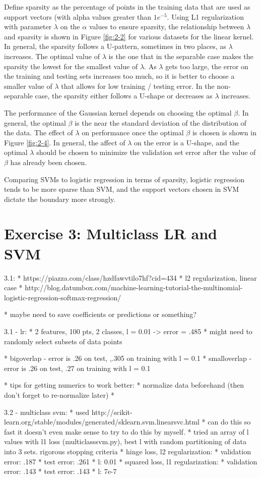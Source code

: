 \documentclass[10pt]{article}
\begin{document}
Define sparsity as the percentage of points in the training data that are used as support vectors (with alpha values greater than $1e^{-5}$. Using L1 regularization with parameter $\lambda$ on the $\alpha$ values to ensure sparsity, the relationship between $\lambda$ and sparsity is shown in Figure \ref{fig:2-2} for various datasets for the linear kernel. In general, the sparsity follows a U-pattern, sometimes in two places, as $\lambda$ increases. The optimal value of $\lambda$ is the one that in the separable case makes the sparsity the lowest for the smallest value of $\lambda$. As $\lambda$ gets too large, the error on the training and testing sets increases too much, so it is better to choose a smaller value of $\lambda$ that allows for low training / testing error. In the non-separable case, the sparsity either follows a U-shape or decreases as $\lambda$ increases.

The performance of the Gaussian kernel depends on choosing the optimal $\beta$. In general, the optimal $\beta$ is the near the standard deviation of the distribution of the data. The effect of $\lambda$ on performance once the optimal $\beta$ is chosen is shown in Figure \ref{fig:2-4}. In general, the affect of $\lambda$ on the error is a U-shape, and the optimal $\lambda$ should be chosen to minimize the validation set error after the value of $\beta$ has already been chosen.

Comparing SVMs to logistic regression in terms of sparsity, logistic regression tends to be more sparse than SVM, and the support vectors chosen in SVM dictate the boundary more strongly.

\section{Exercise 3: Multiclass LR and SVM}



3.1:
* https://piazza.com/class/hzdfawvtilo7hf?cid=434
* l2 regularization, linear case
* http://blog.datumbox.com/machine-learning-tutorial-the-multinomial-logistic-regression-softmax-regression/

* maybe need to save coefficients or predictions or something?

3.1 - lr:
* 2 features, 100 pts, 2 classes, l = 0.01 -> error = .485
* might need to randomly select subsets of data points

* bigoverlap - error is .26 on test, ,.305 on training with l = 0.1
* smalloverlap - error is .26 on test, .27 on training with l = 0.1

* tips for getting numerics to work better:
	* normalize data beforehand (then don't forget to re-normalize later)
	* 

3.2 - multiclass svm:
* used http://scikit-learn.org/stable/modules/generated/sklearn.svm.linearsvc.html
* can do this so fast it doesn't even make sense to try to do this by myself.
* tried an array of l values with l1 loss (multiclasssvm.py), best l with random partitioning of data into 3 sets. rigorous stopping criteria
* hinge loss, l2 regularization: 
	* validation error: .187
	* test error: .261
	* l: 0.01
* squared loss, l1 regularization:
	* validation error: .143
	* test error: .143
	* l: 7e-7
\end{document}
